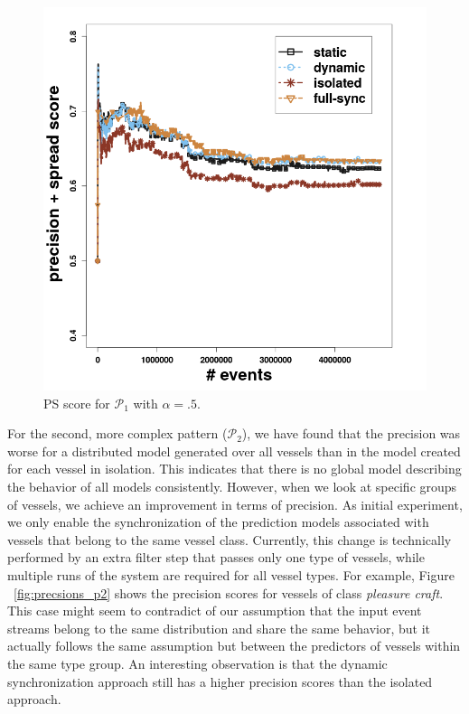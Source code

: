 \begin{center}
	\centering
	\begin{figure}[H]
		
		\includegraphics[width=\textwidth]{chapters/figures/synopses/p1_new_score_100_2_08.png}
		
		\caption{PS score for $\mathcal{P}_1$ with $\alpha = .5$.}
		\label{fig:spread_prec}
	\end{figure}
\end{center}


\par For the second, more complex pattern ($\mathcal{P}_2$), we have found that the precision was worse for a distributed model generated over all vessels than in the model created for each vessel in isolation. This indicates that there is no global model describing the behavior of all models consistently. However, when we look at specific groups of vessels, we achieve an improvement in terms of precision. As initial experiment, we only enable the synchronization of the prediction models associated with vessels that belong to the same vessel class. Currently, this change is technically performed by an extra filter step that passes only one type of vessels, while multiple runs of the system are required for all vessel types. For example, Figure ~\ref{fig:precsions_p2} shows the precision scores for vessels of class \textit{pleasure craft}. This case might seem to contradict of our assumption that the input event streams belong to the same distribution and share the same behavior, but it actually follows the same assumption but between the predictors of vessels within the same type group. An interesting observation is that the dynamic synchronization approach still has a higher precision scores than the isolated approach.

